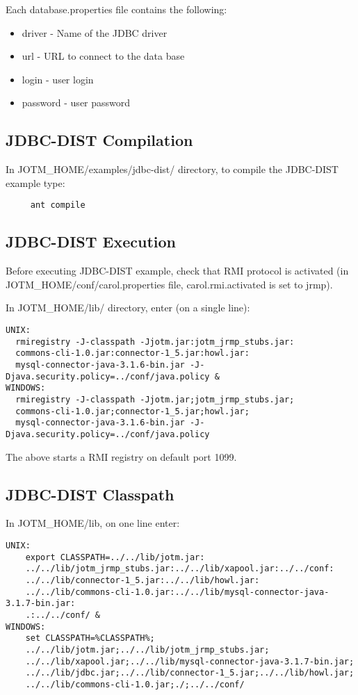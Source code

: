 \documentclass[a4paper,11pt]{article}
\begin{document}
\noindent Each database.properties file contains the following:
\begin{itemize}
\item driver - Name of the JDBC driver
\item url - URL to connect to the data base
\item login - user login
\item password - user password
\end{itemize}

\subsection{JDBC-DIST Compilation}

In JOTM\_HOME/examples/jdbc-dist/ directory, to compile the JDBC-DIST example type:
\begin{verbatim}
     ant compile
\end{verbatim}

\subsection{JDBC-DIST Execution}
Before executing JDBC-DIST example, check that RMI protocol is
activated (in JOTM\_HOME/conf/carol.properties file, carol.rmi.activated
is set to jrmp). 

\noindent In JOTM\_HOME/lib/ directory, enter (on a single line): 
\begin{verbatim}
UNIX:
  rmiregistry -J-classpath -Jjotm.jar:jotm_jrmp_stubs.jar: 
  commons-cli-1.0.jar:connector-1_5.jar:howl.jar: 
  mysql-connector-java-3.1.6-bin.jar -J-Djava.security.policy=../conf/java.policy & 
WINDOWS: 
  rmiregistry -J-classpath -Jjotm.jar;jotm_jrmp_stubs.jar; 
  commons-cli-1.0.jar;connector-1_5.jar;howl.jar; 
  mysql-connector-java-3.1.6-bin.jar -J-Djava.security.policy=../conf/java.policy 
\end{verbatim}

The above starts a RMI registry on default port 1099.

\subsection{JDBC-DIST Classpath}
In JOTM\_HOME/lib, on one line enter:

\begin{verbatim}
UNIX:
    export CLASSPATH=../../lib/jotm.jar: 
    ../../lib/jotm_jrmp_stubs.jar:../../lib/xapool.jar:../../conf: 
    ../../lib/connector-1_5.jar:../../lib/howl.jar: 
    ../../lib/commons-cli-1.0.jar:../../lib/mysql-connector-java-3.1.7-bin.jar:
    .:../../conf/ & 
WINDOWS: 
    set CLASSPATH=%CLASSPATH%;
    ../../lib/jotm.jar;../../lib/jotm_jrmp_stubs.jar;
    ../../lib/xapool.jar;../../lib/mysql-connector-java-3.1.7-bin.jar;
    ../../lib/jdbc.jar;../../lib/connector-1_5.jar;../../lib/howl.jar;
    ../../lib/commons-cli-1.0.jar;./;../../conf/
\end{verbatim}
\end{document}
